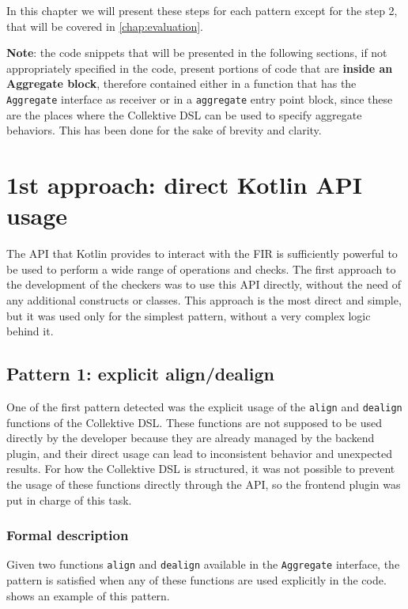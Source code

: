 \documentclass[12pt,a4paper,openright,twoside]{book}
\begin{document}
In this chapter we will present these steps for each pattern except for the step
2, that will be covered in \cref{chap:evaluation}. 

\textbf{Note}: the code snippets that will be presented in the following
sections, if not appropriately specified in the code, present portions of code
that are \textbf{inside an Aggregate block}, therefore contained either in a
function that has the \lstinline{Aggregate} interface as receiver or in a 
\lstinline{aggregate} entry point block, since these are the places where 
the Collektive DSL can be used to specify aggregate behaviors. This has been
done for the sake of brevity and clarity.

\section{1st approach: direct Kotlin API usage}

The API that Kotlin provides to interact with the \ac{FIR} is sufficiently
powerful to be used to perform a wide range of operations and checks. The
first approach to the development of the checkers was to use this API directly,
without the need of any additional constructs or classes. This approach is the
most direct and simple, but it was used only for the simplest pattern, without a
very complex logic behind it.

\subsection{Pattern 1: explicit align/dealign}

One of the first pattern detected was the explicit usage of the
\lstinline{align} and \lstinline{dealign} functions of the Collektive DSL. These
functions are not supposed to be used directly by the developer because they are
already managed by the backend plugin, and their direct usage can lead to
inconsistent behavior and unexpected results. For how the Collektive DSL is
structured, it was not possible to prevent the usage of these functions directly
through the API, so the frontend plugin was put in charge of this task.

\subsubsection{Formal description}

Given two functions \lstinline{align} and \lstinline{dealign} available in the
\lstinline{Aggregate} interface, the pattern is satisfied when any of these
functions are used explicitly in the code.  shows an
example of this pattern.
\end{document}
